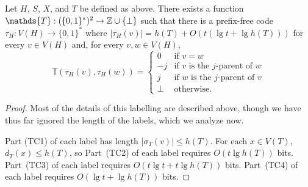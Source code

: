 \documentclass[kpfonts]{patmorin}
\begin{document}
\begin{lem}
  Let $H$, $S$, $X$, and $T$ be defined as above.  There exists a function $\mathds{T}:(\{0,1\}^*)^2\to \Z\cup\{\perp\}$ such that there is a prefix-free code $\tau_H:V(H)\to\{0,1\}^*$ where $|\tau_H(v)|=h(T) + O(t(\lg t + \lg h(T)))$ for every $v\in V(H)$ and, for every $v,w\in V(H)$, 
  \[
      \mathds{T}(\tau_H(v),\tau_H(w)) = \begin{cases}
      0 & \text{if $v=w$} \\
      -j & \text{if $v$ is the $j$-parent of $w$} \\
      j & \text{if $w$ is the $j$-parent of $v$} \\
      \perp & \text{otherwise.}
    \end{cases}
  \]
\end{lem}

\begin{proof}
  Most of the details of this labelling are described above, though we have thus far ignored the length of the labels, which we analyze now.
  
  Part (TC1) of each label has length $|\sigma_T(v)|\le h(T)$.  For each $x\in V(T)$, $d_T(x)\le h(T)$, so Part~(TC2) of each label requires $O(t\lg h(T))$ bits.  Part~(TC3) of each label requires $O(t\lg t + t\lg h(T))$ bits.  Part~(TC4) of each label requires $O(\lg t + \lg h(T))$ bits.
\end{proof}

% 
\end{document}
